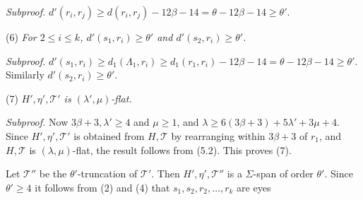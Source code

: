 \textit{Subproof.} $d'(r_i, r_j) \ge d(r_i, r_j) - 12\beta - 14 = \theta - 12\beta - 14 \ge \theta'$.

\hspace*{12pt}(6) \textit{For $2 \le i \le k$, $d'(s_1, r_i) \ge \theta'$ and $d'(s_2, r_i) \ge \theta'$.}

\textit{Subproof.} $d'(s_1, r_i) \ge d_1(\Lambda_1, r_i) \ge d_1(r_1, r_i) - 12\beta - 14 = \theta - 12\beta - 14 \ge \theta'$. Similarly $d'(s_2, r_i) \ge \theta'$.

\hspace*{12pt}(7) \textit{$H', \eta', \mathcal{T}'$ is $(\lambda', \mu)$-flat.}

\textit{Subproof.} Now $3\beta + 3, \lambda' \ge 4$ and $\mu \ge 1$, and $\lambda \ge 6(3\beta + 3) + 5\lambda' + 3\mu + 4$. Since $H', \eta', \mathcal{T}'$ is obtained from $H, \mathcal{T}$ by rearranging within $3\beta + 3$ of $r_1$, and $H, \mathcal{T}$ is $(\lambda, \mu)$-flat, the result follows from (5.2). This proves (7).

Let $\mathcal{T}''$ be the $\theta'$-truncation of $\mathcal{T}'$. Then $H', \eta', \mathcal{T}''$ is a $\Sigma$-span of order $\theta'$. Since $\theta' \ge 4$ it follows from (2) and (4) that $s_1, s_2, r_2, \dots, r_k$ are eyes
